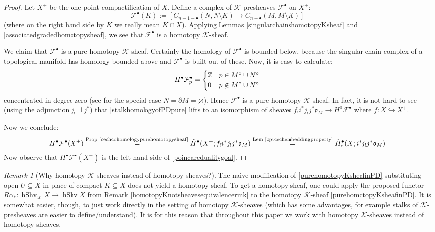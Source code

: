 \documentclass[12pt]{article}
\theoremstyle{definition}
\theoremstyle{remark}
\newtheorem{remark}[theorem]{Remark}
\numberwithin{equation}{subsection}
\newcommand{\F}{\mathcal F}
\newcommand{\K}{\mathcal K}
\newcommand{\oo}{\mathfrak o}
\newcommand{\ZZ}{\mathbb Z}
\newcommand{\cH}{\check H}
\newcommand{\hShv}{\operatorname{hShv}}
\begin{document}
\begin{proof}
Let $X^+$ be the one-point compactification of $X$.  Define a complex of $\K$-presheaves $\F^\bullet$ on $X^+$:
\begin{equation}\label{purehomotopyKsheafinPD}
\F^\bullet(K):=[C_{n-1-\bullet}(N,N\setminus K)\to C_{n-\bullet}(M,M\setminus K)]
\end{equation}
(where on the right hand side by $K$ we really mean $K\cap X$).  Applying Lemmas \ref{singularchainshomotopyKsheaf} and \ref{associatedgradedhomotopysheaf}, we see that $\F^\bullet$ is a homotopy $\K$-sheaf.

We claim that $\F^\bullet$ is a pure homotopy $\K$-sheaf.  Certainly the homology of $\F^\bullet$ is bounded below, because the singular chain complex of a topological manifold has homology bounded above and $\F^\bullet$ is built out of these.  Now, it is easy to calculate:
\begin{equation}\label{stalkhomologyofPDpure}
H^\bullet\F^\bullet_p=\begin{cases}\ZZ&p\in M^\circ\cup N^\circ\cr 0&p\notin M^\circ\cup N^\circ\end{cases}
\end{equation}
concentrated in degree zero (see \cite[p231 \S3.3]{hatcher} for the special case $N=\partial M=\varnothing$).  Hence $\F^\bullet$ is a pure homotopy $\K$-sheaf.  In fact, it is not hard to see (using the adjunction $j_!\dashv j^\ast$) that \eqref{stalkhomologyofPDpure} lifts to an isomorphism of sheaves $f_!i^\ast j_!j^\ast\oo_M\to H^0\F^\bullet$ where $f:X\hookrightarrow X^+$.

Now we conclude:
\begin{equation*}
H^\bullet\F^\bullet(X^+)\overset{\text{Prop \ref{cechcohomologypurehomotopysheaf}}}=\cH^\bullet(X^+;f_!i^\ast j_!j^\ast\oo_M)\overset{\text{Lem \ref{cptcechembeddingproperty}}}=\cH^\bullet_c(X;i^\ast j_!j^\ast\oo_M)
\end{equation*}
Now observe that $H^\bullet\F^\bullet(X^+)$ is the left hand side of \eqref{poincaredualitygoal}.
\end{proof}

\begin{remark}[Why homotopy $\K$-sheaves instead of homotopy sheaves?]
The naive modification of \eqref{purehomotopyKsheafinPD} substituting open $U\subseteq X$ in place of compact $K\subseteq X$ does not yield a homotopy sheaf.  To get a homotopy sheaf, one could apply the proposed functor $R\alpha_\ast:\hShv_\K X\to\hShv X$ from Remark \ref{homotopyKnotsheavesequivalencermk} to the homotopy $\K$-sheaf \eqref{purehomotopyKsheafinPD}.  It is somewhat easier, though, to just work directly in the setting of homotopy $\K$-sheaves (which has some advantages, for example stalks of $\K$-presheaves are easier to define/understand).  It is for this reason that throughout this paper we work with homotopy $\K$-sheaves instead of homotopy sheaves.
\end{remark}
\end{document}
